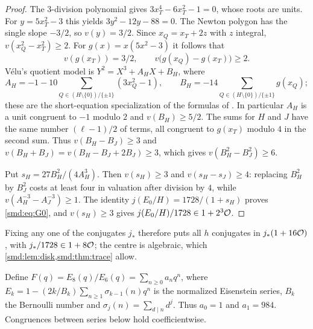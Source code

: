 \begin{proof}
The $3$-division polynomial gives $3x_T^4-6x_T^2-1=0$, whose roots are units. For
$y=5x_T^2-3$ this yields $3y^2-12y-88=0$. The Newton polygon has the single slope $-3/2$,
so $v(y)=3/2$. Since $x_Q=x_T+2z$ with $z$ integral, $v(x_Q^2-x_T^2)\ge2$. For
$g(x)=x(5x^2-3)$ it follows that
\[
 v(g(x_T))=3/2,\qquad v\bigl(g(x_Q)-g(x_T)\bigr)\ge2 .
\]
V\'elu's quotient model is $Y^2=X^3+A_HX+B_H$, where
\[
 A_H=-1-10\!\!\sum_{Q\in(H\setminus\{0\})/\{\pm1\}}\!\!(3x_Q^2-1),\qquad
 B_H=-14\!\!\sum_{Q\in(H\setminus\{0\})/\{\pm1\}}\!\!g(x_Q);
\]
these are the short-equation specialization of the formulas of
\cite[Theorem~1]{Miret2007Generalization}. In particular $A_H$ is a unit congruent to $-1$
modulo $2$ and $v(B_H)\ge5/2$. The sums for $H$ and $J$ have the same number
$(\ell-1)/2$ of terms, all congruent to $g(x_T)$ modulo $4$ in the second sum. Thus
$v(B_H-B_J)\ge3$ and $v(B_H+B_J)=v(B_H-B_J+2B_J)\ge3$, which gives
$v(B_H^2-B_J^2)\ge6$.

Put $s_H=27B_H^2/(4A_H^3)$. Then $v(s_H)\ge3$ and $v(s_H-s_J)\ge4$: replacing $B_H^2$ by
$B_J^2$ costs at least four in valuation after division by $4$, while
$v(A_H^{-3}-A_J^{-3})\ge1$. The identity $j(E_0/H)=1728/(1+s_H)$ proves
\eqref{smd:eq:G0}, and $v(s_H)\ge3$ gives $j(E_0/H)/1728\in1+2^3\mathcal{O}$.
\end{proof}

Fixing any one of the conjugates $j_*$ therefore puts all $h$ conjugates in
$j_*(1+16\mathcal{O})$, with $j_*/1728\in1+8\mathcal{O}$; the centre is algebraic, which
\cref{smd:lem:disk,smd:thm:trace} allow.


Define $F(q)=E_8(q)/E_6(q)=\sum_{n\ge0}a_nq^n$, where
$E_k=1-(2k/B_k)\sum_{n\ge1}\sigma_{k-1}(n)q^n$ is the normalized Eisenstein series, $B_k$
the Bernoulli number and $\sigma_j(n)=\sum_{d\mid n}d^j$. Thus $a_0=1$ and $a_1=984$.
Congruences between series below hold coefficientwise.

